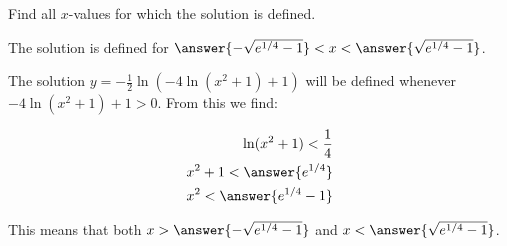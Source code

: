 \documentclass{ximera}
\begin{document}
\begin{exercise}
\begin{exercise}
\begin{hint}
\begin{question}
\begin{question}
\end{question}
\end{question}
 \end{hint}
 
\begin{exercise}
Find all $x$-values for which the solution is defined.

The solution is defined for $\answer{-\sqrt{e^{1/4}-1}} < x <  \answer{\sqrt{e^{1/4}-1}}$.

\begin{hint}
The solution $y= -\frac{1}{2}\ln(-4 \ln(x^2+1)+1)$ will be defined whenever $-4 \ln(x^2+1)+1 >0$.  From this we find:

\begin{align*}
\ln(x^2+1) < \frac{1}{4} \\
x^2+1 < \answer{e^{1/4}} \\
x^2 < \answer{e^{1/4}-1} \\
\end{align*}

This means that both  $x>  \answer{-\sqrt{e^{1/4}-1}}$ and $x<  \answer{\sqrt{e^{1/4}-1}}$.
\end{hint}
\end{exercise}
 \end{exercise}
\end{exercise}
\end{document}
